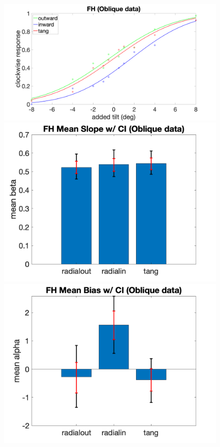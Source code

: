 \documentclass[11pt]{article} %
\begin{document}
\begin{figure}[H]
\includegraphics[scale=.06]{Images/PF_FH_oblique.png}
\includegraphics[scale=.11]{Images/MeanSlopeError_ci_FH_oblique.png}
\includegraphics[scale=.11]{Images/MeanBiasError_ci_FH_oblique.png}

\end{figure}
\end{document}
